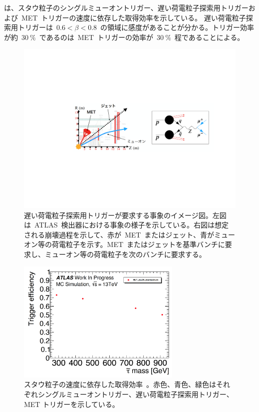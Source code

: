 は、スタウ粒子のシングルミューオントリガー、遅い荷電粒子探索用トリガーおよび~MET~トリガーの速度に依存した取得効率を示している。
遅い荷電粒子探索用トリガーは~$0.6<\beta<0.8$~の領域に感度があることが分かる。トリガー効率が約~$30~\%$~であるのは~MET~トリガーの効率が~$30~\%$~程であることによる。

\begin{figure}[H]
        \centering   
        \includegraphics[width=\textwidth,page=1]{img/pdf3/met.pdf}
        \caption[遅い荷電粒子探索用トリガーが要求する事象のイメージ図]{遅い荷電粒子探索用トリガーが要求する事象のイメージ図。左図は~ATLAS~検出器における事象の様子を示している。右図は想定される崩壊過程を示して、赤が~MET~またはジェット、青がミューオン等の荷電粒子を示す。MET~またはジェットを基準バンチに要求し、ミューオン等の荷電粒子を次のバンチに要求する。}
        \label{fig:met}
\end{figure}

\begin{figure}[H]
        \centering   
        \includegraphics[width=0.7\textwidth,page=3]{img/pdf3/sumi.pdf}
        \caption[スタウ粒子の速度に依存した取得効率]{スタウ粒子の速度に依存した取得効率~\cite{MT:01}。赤色、青色、緑色はそれぞれシングルミューオントリガー、遅い荷電粒子探索用トリガー、MET トリガーを示している。}
        \label{fig:sumi3}
\end{figure}

